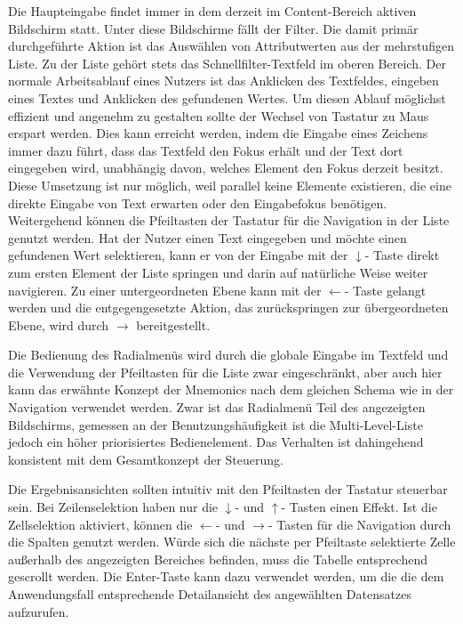 Die Haupteingabe findet immer in dem derzeit im Content-Bereich aktiven Bildschirm statt. Unter diese Bildschirme fällt der Filter. Die damit primär durchgeführte Aktion ist das Auswählen von Attributwerten aus der mehrstufigen Liste. Zu der Liste gehört stets das Schnellfilter-Textfeld im oberen Bereich. Der normale Arbeitsablauf eines Nutzers ist das Anklicken des Textfeldes, eingeben eines Textes und Anklicken des gefundenen Wertes. Um diesen Ablauf möglichst effizient und angenehm zu gestalten sollte der Wechsel von Tastatur zu Maus erspart werden. Dies kann erreicht werden, indem die Eingabe eines Zeichens immer dazu führt, dass das Textfeld den Fokus erhält und der Text dort eingegeben wird, unabhängig davon, welches Element den Fokus derzeit besitzt. Diese Umsetzung ist nur möglich, weil parallel keine Elemente existieren, die eine direkte Eingabe von Text erwarten oder den Eingabefokus benötigen. Weitergehend können die Pfeiltasten der Tastatur für die Navigation in der Liste genutzt werden. Hat der Nutzer einen Text eingegeben und möchte einen gefundenen Wert selektieren, kann er von der Eingabe mit der $\downarrow$- Taste direkt zum ersten Element der Liste springen und darin auf natürliche Weise weiter navigieren. Zu einer untergeordneten Ebene kann mit der $\leftarrow$- Taste gelangt werden und die entgegengesetzte Aktion, das zurückspringen zur übergeordneten Ebene, wird durch $\rightarrow$ bereitgestellt.\par
Die Bedienung des Radialmenüs wird durch die globale Eingabe im Textfeld und die Verwendung der Pfeiltasten für die Liste zwar eingeschränkt, aber auch hier kann das erwähnte Konzept der Mnemonics nach dem gleichen Schema wie in der Navigation verwendet werden. Zwar ist das Radialmenü Teil des angezeigten Bildschirms, gemessen an der Benutzungshäufigkeit ist die Multi-Level-Liste jedoch ein höher priorisiertes Bedienelement. Das Verhalten ist dahingehend konsistent mit dem Gesamtkonzept der Steuerung.\par
{}
Die Ergebnisansichten sollten intuitiv mit den Pfeiltasten der Tastatur steuerbar sein. Bei Zeilenselektion haben nur die $\downarrow$- und $\uparrow$- Tasten einen Effekt. Ist die Zellselektion aktiviert, können die $\leftarrow$- und $\rightarrow$- Tasten für die Navigation durch die Spalten genutzt werden. Würde sich die nächste per Pfeiltaste selektierte Zelle außerhalb des angezeigten Bereiches befinden, muss die Tabelle entsprechend gescrollt werden. Die Enter-Taste kann dazu verwendet werden, um die die dem Anwendungsfall entsprechende Detailansicht des angewählten Datensatzes aufzurufen.\par
